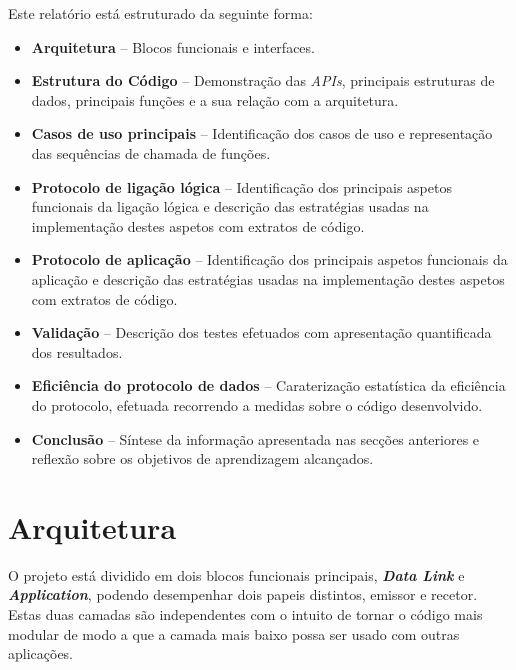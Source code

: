 \documentclass[a4paper,11pt,portuguese]{article}
\begin{document}
    \hfill \break
    \noindent Este relatório está estruturado da seguinte forma:
    \begin{itemize}
        \item \textbf{Arquitetura} -- Blocos funcionais e interfaces.
        
        \item \textbf{Estrutura do Código} -- Demonstração das \textit{APIs}, principais 
        estruturas de dados, principais funções e a sua relação com a arquitetura.

        \item \textbf{Casos de uso principais} -- Identificação dos casos de uso 
        e representação das sequências de chamada de funções.

        \item \textbf{Protocolo de ligação lógica} -- Identificação dos principais
        aspetos funcionais da ligação lógica e descrição das estratégias usadas na
        implementação destes aspetos com extratos de código.

        \item \textbf{Protocolo de aplicação} -- Identificação dos principais
        aspetos funcionais da aplicação e descrição das estratégias usadas na
        implementação destes aspetos com extratos de código.

        \item \textbf{Validação} -- Descrição dos testes efetuados com apresentação
        quantificada dos resultados.

        \item \textbf{Eficiência do protocolo de dados} -- Caraterização estatística 
        da eficiência do protocolo, efetuada recorrendo a medidas sobre o código
        desenvolvido.

        \item \textbf{Conclusão} -- Síntese da informação apresentada nas secções
        anteriores e reflexão sobre os objetivos de aprendizagem alcançados.
        
    \end{itemize}


\section{Arquitetura}
    
    O projeto está dividido em dois blocos funcionais principais, \textbf{\textit{Data Link}} e 
    \textbf{\textit{Application}}, podendo desempenhar dois papeis distintos, emissor e recetor.
    Estas duas camadas são independentes com o intuito de tornar o código mais modular de 
    modo a que a camada mais baixo possa ser usado com outras aplicações. \par
    
\end{document}
